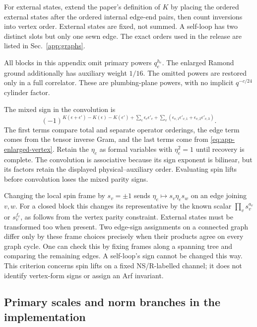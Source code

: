 For external states, extend the paper's definition of $K$ by placing
the ordered external states after the ordered internal edge-end pairs,
then count inversions into vertex order. External states are fixed,
not summed. A self-loop has two distinct slots but only one sewn edge.
The exact orders used in the release are listed in Sec.~\ref{app:graphs}.

All blocks in this appendix omit primary powers $q_e^{h_e}$.
The enlarged Ramond ground additionally has auxiliary weight $1/16$.
The omitted powers are restored only in a full correlator. These are
plumbing-plane powers, with no implicit $q^{-c/24}$ cylinder factor.

The mixed sign in the convolution is
\begin{equation}
 (-1)^{K(\epsilon+\epsilon')-K(\epsilon)-K(\epsilon')
        +\sum_e\epsilon_e\epsilon'_e
        +\sum_v(\epsilon_{v,1}\epsilon'_{v,1}
                +\epsilon_{v,2}\epsilon'_{v,3})}.
 \label{eq:app-convolution-sign}
\end{equation}
The first terms compare total and separate operator orderings,
the edge term comes from the tensor inverse Gram, and the last
terms come from \eqref{eq:app-enlarged-vertex}. Retain the $\eta_e$ as
formal variables with $\eta_e^2=1$ until recovery is complete.
The convolution is associative because its sign exponent is bilinear,
but its factors retain the displayed physical--auxiliary order.
Evaluating spin lifts before convolution loses the mixed parity signs.

Changing the local spin frame by $s_v=\pm1$ sends
$\eta_e\mapsto s_v\eta_es_w$ on an edge joining $v,w$.
For a closed block this changes its representative by the known scalar
$\prod_v s_v^{a_v}$ or $s_v^{f_v}$, as follows from the vertex parity
constraint. External states must be transformed too when present.
Two edge-sign assignments on a connected graph differ only by these
frame choices precisely when their products agree on every graph cycle.
One can check this by fixing frames along a spanning tree and comparing
the remaining edges. A self-loop's sign cannot be changed this way.
This criterion concerns spin lifts on a fixed NS/R-labelled channel;
it does not identify vertex-form signs or assign an Arf invariant.

\subsection{Primary scales and norm branches in the implementation}
\label{app:branches}

